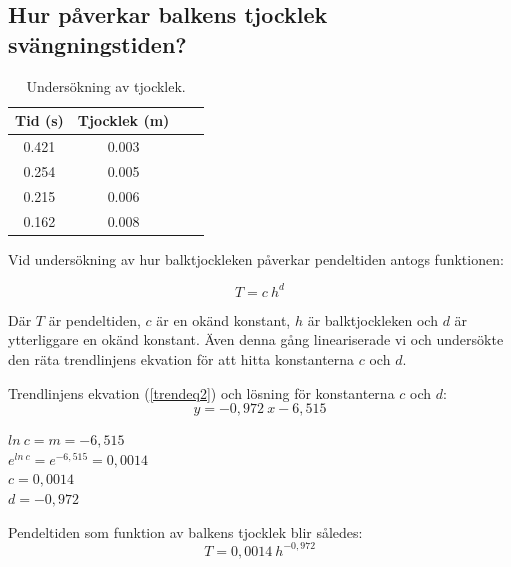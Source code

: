 \documentclass[10pt, titlepage, oneside, a4paper]{article}
\begin{document}
        \subsection{Hur påverkar balkens tjocklek svängningstiden?}
        \begin{table}[H]
            \caption{Undersökning av tjocklek.}
            \begin{center}
                \begin{tabular}{cccc}
                    \hline
                    Tid (s) &Tjocklek (m)\\
                    \hline
                    0.421 & 0.003\\
                    0.254 & 0.005\\
                    0.215 & 0.006\\
                    0.162 & 0.008\\
                \end{tabular}
            \end{center}
        \end{table}  

Vid undersökning av hur balktjockleken påverkar pendeltiden antogs funktionen:

\begin{equation}
T=c\:h^d
\end{equation}
\begin{center}
Där $T$ är pendeltiden, $c$ är en okänd konstant, $h$ är balktjockleken och $d$ är ytterliggare en okänd konstant. Även denna gång lineariserade vi och undersökte den räta trendlinjens ekvation för att hitta konstanterna $c$ och $d$.\\
\end{center}

\vspace{10pt}
Trendlinjens ekvation (\ref{trendeq2}) och lösning för konstanterna $c$ och $d$:
\begin{equation}\label{trendeq2}
y=-0,972\ x - 6,515
\end{equation}

\begin{center}
$ln\:c=m=-6,515$ \\
$e^{ln\:c} = e^{-6,515}=0,0014$ \\
$c=0,0014$ \\
\vspace{10pt}
$d=-0,972$
\end{center}

\vspace{10pt}
Pendeltiden som funktion av balkens tjocklek blir således:
\begin{equation}\label{thicknesseq1}
T=0,0014\ h^{-0,972}
\end{equation}
        
\end{document}

